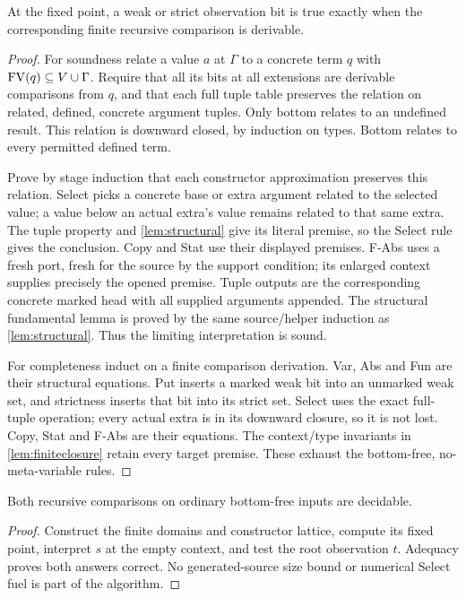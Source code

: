 \documentclass[11pt,a4paper]{article}
\begin{document}
\begin{lemma}[Adequacy]\label{lem:adequacy}
At the fixed point, a weak or strict observation bit is true exactly when the
corresponding finite recursive comparison is derivable.
\end{lemma}
\begin{proof}
For soundness relate a value $a$ at $\Gamma$ to a concrete term $q$ with
$\operatorname{FV}(q)\subseteq V\cup\Gamma$.  Require that all its bits at all extensions
are derivable comparisons from $q$, and that each full tuple table preserves
the relation on related, defined, concrete argument tuples.  Only bottom
relates to an undefined result.  This relation is downward closed, by induction
on types.  Bottom relates to every permitted defined term.

Prove by stage induction that each constructor approximation preserves this
relation.  Select picks a concrete base or extra argument related to the
selected value; a value below an actual extra's value remains related to that
same extra.  The tuple property and \ref{lem:structural} give its literal
premise, so the Select rule gives the conclusion.  Copy and Stat use their
displayed premises.  F-Abs uses a fresh port, fresh for the source by the
support condition; its enlarged context supplies precisely the opened
premise.  Tuple outputs are the corresponding concrete marked head with all
supplied arguments appended.  The structural fundamental lemma is proved by
the same source/helper induction as \ref{lem:structural}.  Thus the limiting
interpretation is sound.

For completeness induct on a finite comparison derivation.  Var, Abs and Fun
are their structural equations.  Put inserts a marked weak bit into an
unmarked weak set, and strictness inserts that bit into its strict set.
Select uses the exact full-tuple operation; every actual extra is in its
downward closure, so it is not lost.  Copy, Stat and F-Abs are their equations.
The context/type invariants in \ref{lem:finiteclosure} retain every target
premise.  These exhaust the bottom-free, no-meta-variable rules.
\end{proof}

\begin{theorem}\label{thm:decide}
Both recursive comparisons on ordinary bottom-free inputs are decidable.
\end{theorem}
\begin{proof}
Construct the finite domains and constructor lattice, compute its fixed point,
interpret $s$ at the empty context, and test the root observation $t$.
Adequacy proves both answers correct.  No generated-source size bound or
numerical Select fuel is part of the algorithm.
\end{proof}
\end{document}
